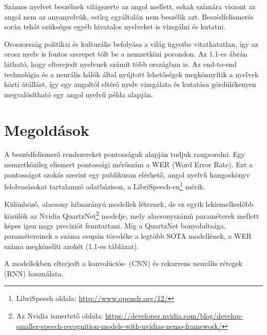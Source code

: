 
Számos nyelvet beszélnek világszerte az angol mellett, sokak számára viszont az angol nem az anyanyelvük, estleg egyáltalán nem beszélik azt. Beszédfelismerés során tehát szükséges egyéb hivatalos nyelveket is vizsgálni és kutatni.

Oroszország politikai és kulturális befolyása a világ ügyeibe vitathatatlan, így az orosz nyelv is fontos szerepet tölt be a nemzetközi porondon. Az 1.1-es ábrán látható, hogy elterejedt nyelvnek számít több országban is. Az end-to-end technológia és a neurális hálók által nyújtott lehetőségek megkönnyítik a nyelvek közti átállást, így egy angoltól eltérő nyelv vizsgálata és kutatása gördülékenyen megvalósítható egy angol nyelvű példa alapján.

\section{Megoldások}

A beszédfelismerő rendszereket pontosságuk alapján tudjuk rangsorolni. Egy nemzetközileg elismert pontossági mérőszám a WER (Word Error Rate). Ezt a pontosságot szokás szerint egy publikusan elérhető, angol nyelvű hangoskönyv felolvasásokat tartalamzó adatbázison, a LibriSpeech-en\footnote{LibriSpeech oldala: \url{http://www.openslr.org/12/}} mérik.

Különböző, alacsony hibaarányú modellek léteznek, de ez egyik lekiemelkedőbb közülök az Nvidia QuartzNet\footnote{Az Nvidia ismertető oldala: \url{https://developer.nvidia.com/blog/develop-smaller-speech-recognition-models-with-nvidias-nemo-framework/}} modelje, mely alacsonyszámú paraméterek mellett képes igen nagy preciziót fenntartani. Míg a QuartzNet bonyolultsága, paramétereinek a száma csupán töredéke a legtöbb SOTA modellének, a WER száma megközelíti azokét (1.1-es táblázat).

A modellekben elterjedt a konvolúciós- (CNN) és rekurrens neurális rétegek  (RNN) használata.

